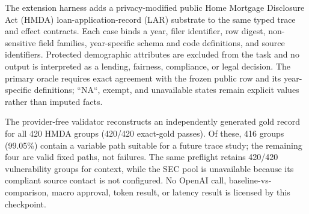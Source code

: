 The extension harness adds a privacy-modified public Home Mortgage Disclosure Act
(HMDA) loan-application-record (LAR) substrate to the same typed trace and effect
contracts.  Each case binds a year, filer identifier, row digest, non-sensitive field
families, year-specific schema and code definitions, and source identifiers.  Protected
demographic attributes are excluded from the task and no output is interpreted as a
lending, fairness, compliance, or legal decision.  The primary oracle requires exact
agreement with the frozen public row and its year-specific definitions; ``NA``, exempt,
and unavailable states remain explicit values rather than imputed facts.

The provider-free validator reconstructs an independently generated gold record for all
420 HMDA groups (420/420 exact-gold passes).  Of these, 416 groups (99.05\%) contain a
variable path suitable for a future trace study; the remaining four are valid fixed
paths, not failures.  The same preflight retains 420/420 vulnerability groups for
context, while the SEC pool is unavailable because its compliant source contact is not
configured.  No OpenAI call, baseline-vs-\grc comparison, macro approval, token result,
or latency result is licensed by this checkpoint.

\begin{table}[t]
  \centering
  \caption{Provider-free public-record extension preflight.  Exact gold is an independently
  implemented reconstruction, not a model-quality score.  Variable paths identify cases
  that could support a future trace comparison.}
  \label{tab:multidomain-preflight}
  \small
  
\end{table}

